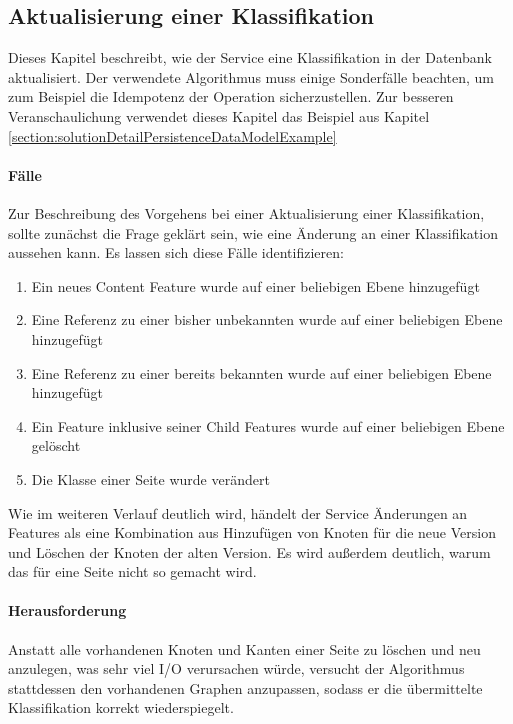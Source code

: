\subsection{Aktualisierung einer Klassifikation}
    \label{section:solutionDetailsClassificationStorageAPIUpdatePage}
    Dieses Kapitel beschreibt, wie der Service eine Klassifikation in der Datenbank aktualisiert.
    Der verwendete Algorithmus muss einige Sonderfälle beachten,
    um zum Beispiel die Idempotenz der Operation sicherzustellen.
    Zur besseren Veranschaulichung verwendet dieses Kapitel das Beispiel
    aus Kapitel \ref{section:solutionDetailPersistenceDataModelExample}

    \paragraph{Fälle}
    Zur Beschreibung des Vorgehens bei einer Aktualisierung einer Klassifikation,
    sollte zunächst die Frage geklärt sein, wie eine Änderung an einer Klassifikation aussehen kann.
    Es lassen sich diese Fälle identifizieren:

    \begin{enumerate}
        \item Ein neues Content Feature wurde auf einer beliebigen Ebene hinzugefügt
        \item Eine Referenz zu einer bisher unbekannten {\resource} wurde auf einer beliebigen Ebene hinzugefügt
        \item Eine Referenz zu einer bereits bekannten {\resource} wurde auf einer beliebigen Ebene hinzugefügt
        \item Ein Feature inklusive seiner Child Features wurde auf einer beliebigen Ebene gelöscht
        \item Die Klasse einer Seite wurde verändert
    \end{enumerate}

    Wie im weiteren Verlauf deutlich wird,
    händelt der Service Änderungen an Features als eine Kombination aus
    Hinzufügen von Knoten für die neue Version und Löschen der Knoten der alten Version.
    Es wird außerdem deutlich, warum das für eine Seite nicht so gemacht wird.

    \paragraph{Herausforderung}
    Anstatt alle vorhandenen Knoten und Kanten einer Seite zu löschen
    und neu anzulegen, was sehr viel I/O verursachen würde,
    versucht der Algorithmus stattdessen den vorhandenen Graphen anzupassen,
    sodass er die übermittelte Klassifikation korrekt wiederspiegelt.
    
